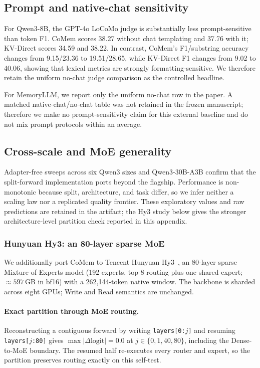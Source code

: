 \subsection{Prompt and native-chat sensitivity}

For Qwen3-8B, the GPT-4o LoCoMo judge is substantially less prompt-sensitive
than token F1. CoMem scores 38.27 without chat templating and 37.76 with it;
KV-Direct scores 34.59 and 38.22. In contrast, CoMem's F1/substring accuracy
changes from 9.15/23.36 to 19.51/28.65, while KV-Direct F1 changes from 9.02 to
40.06, showing that lexical metrics are strongly formatting-sensitive. We therefore retain the uniform
no-chat judge comparison as the controlled headline.

For MemoryLLM, we report only the uniform no-chat row in the paper. A matched
native-chat/no-chat table was not retained in the frozen manuscript; therefore
we make no prompt-sensitivity claim for this external baseline and do not mix
prompt protocols within an average.

\subsection{Cross-scale and MoE generality}
\label{app:generality}
Adapter-free sweeps across six Qwen3 sizes and Qwen3-30B-A3B confirm that the
split-forward implementation ports beyond the flagship. Performance is
non-monotonic because split, architecture, and task differ, so we infer neither
a scaling law nor a replicated quality frontier. These exploratory values and
raw predictions are retained in the artifact; the Hy3 study below gives the
stronger architecture-level partition check reported in this appendix.

\subsubsection{Hunyuan Hy3: an 80-layer sparse MoE}
\label{sec:hy3-general}
We additionally port CoMem to Tencent Hunyuan Hy3~\citep{hunyuan}, an 80-layer sparse
Mixture-of-Experts model (192 experts, top-8 routing plus one shared expert;
$\approx597$\,GB in bf16) with a 262,144-token native window. The backbone is
sharded across eight GPUs; Write and Read semantics are unchanged.

\paragraph{Exact partition through MoE routing.}
Reconstructing a contiguous forward by writing \texttt{layers[0:$j$]} and
resuming \texttt{layers[$j$:80]} gives
$\max|\Delta\mathrm{logit}|=0.0$ at $j\in\{0,1,40,80\}$, including the
Dense-to-MoE boundary. The resumed half re-executes every router and expert, so
the partition preserves routing exactly on this self-test.

